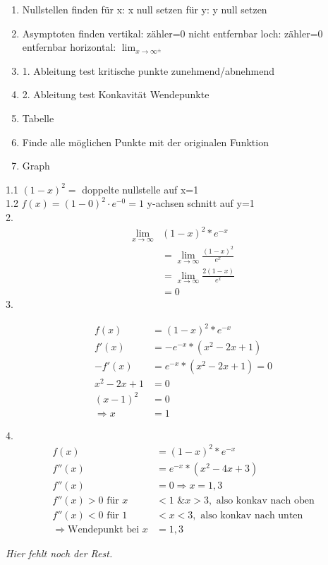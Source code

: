 \documentclass{report}
\begin{document}
\begin{multicols}{2}

\begin{tcolorbox}[colback=blue!10!white,colframe=green!50!black,title=Schritte zum Skizzieren]
\begin{enumerate}
  \item Nullstellen finden
    \subitem f\"ur x: x null setzen
    \subitem f\"ur y: y null setzen
  \item Asymptoten finden
    \subitem vertikal: z\"ahler=0 nicht entfernbar
    \subitem loch: z\"ahler=0 entfernbar
    \subitem horizontal: $\lim_{x \to \infty^\pm}$
  \item 1. Ableitung test
    \subitem kritische punkte
    \subitem zunehmend/abnehmend
  \item 2. Ableitung test
    \subitem Konkavität
    \subitem Wendepunkte
  \item Tabelle
  \item Finde alle m\"oglichen Punkte mit der originalen Funktion
  \item Graph
\end{enumerate}
\end{tcolorbox}

1.1 $(1-x)^2 =$ doppelte nullstelle auf x=1\\
1.2 $f(x)=(1-0)^2\cdot e^{-0} = 1$ y-achsen schnitt auf y=1\\
2. 
\begin{align*}
\lim_{x \to \infty}&(1-x)^2 * e^{-x} \\
                   &= \lim_{x \to \infty} \frac{(1-x)^2}{e^x} \\
&= \lim_{x \to \infty} \frac{2(1-x)}{e^x} \\
&= 0
\end{align*}
3. 

\begin{align*}
f(x) &= (1-x)^2 * e^{-x} \\
f'(x) &= -e^{-x}*(x^2-2x+1) \\
-f'(x) &= e^{-x}*(x^2-2x+1) = 0 \\
x^2 - 2x + 1 &= 0 \\
(x-1)^2 &= 0 \\
\Rightarrow x &= 1
\end{align*}

4. 
\begin{align*}
f(x) &= (1-x)^2 * e^{-x} \\
f''(x) &= e^{-x}*(x^2-4x+3) \\
f''(x) &= 0 \Rightarrow x = 1, 3 \\
f''(x) > 0 \text{ für } x& < 1 \text{ \& } x > 3, \text{ also konkav nach oben} \\
f''(x) < 0 \text{ für } 1& < x < 3, \text{ also konkav nach unten} \\
\Rightarrow \text{Wendepunkt bei } x &= 1, 3
\end{align*}

\textit{Hier fehlt noch der Rest.}
\end{multicols}
\end{document}
